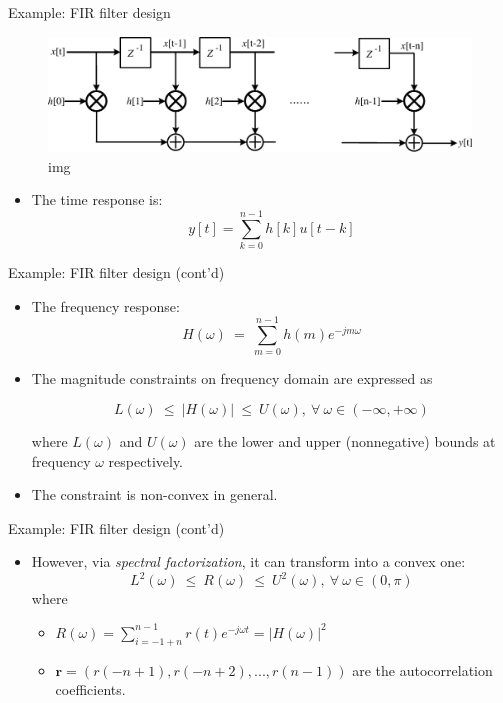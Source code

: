 \documentclass[10pt,ignorenonframetext,serif,onlymath]{beamer}
\providecommand{\tightlist}{%
  \setlength{\itemsep}{0pt}\setlength{\parskip}{0pt}}
\begin{document}
\begin{frame}{Example: FIR filter design}
\protect\hypertarget{example-fir-filter-design}{}

\begin{figure}
\centering
\includegraphics{ellipsoid.files/fir_strctr.pdf}
\caption{img}
\end{figure}

\begin{itemize}
\tightlist
\item
  The time response is: \[y[t] = \sum_{k=0}^{n-1}{h[k]u[t-k]}\]
\end{itemize}

\end{frame}

\begin{frame}{Example: FIR filter design (cont’d)}
\protect\hypertarget{example-fir-filter-design-contd}{}

\begin{itemize}
\item
  The frequency response:
  \[H(\omega)~=~\sum_{m=0}^{n-1}{h(m)e^{-jm\omega}}\]
\item
  The magnitude constraints on frequency domain are expressed as

  \[L(\omega)~\leq~|H(\omega)|~\leq~U(\omega),~\forall~\omega\in(-\infty,+\infty)\]

  where \(L(\omega)\) and \(U(\omega)\) are the lower and upper
  (nonnegative) bounds at frequency \(\omega\) respectively.
\item
  The constraint is non-convex in general.
\end{itemize}

\end{frame}

\begin{frame}{Example: FIR filter design (cont’d)}
\protect\hypertarget{example-fir-filter-design-contd-1}{}

\begin{itemize}
\tightlist
\item
  However, via \emph{spectral factorization}, it can transform into a
  convex one:
  \[L^2(\omega)~\leq~R(\omega)~\leq~U^2(\omega),~\forall~\omega\in(0,\pi)\]
  where

  \begin{itemize}
  \tightlist
  \item
    \(R(\omega)=\sum_{i=-1+n}^{n-1}{r(t)e^{-j{\omega}t}}=|H(\omega)|^2\)
  \item
    \(\mathbf{r}=(r(-n+1),r(-n+2),...,r(n-1))\) are the autocorrelation
    coefficients.
  \end{itemize}
\end{itemize}

\end{frame}
\end{document}

